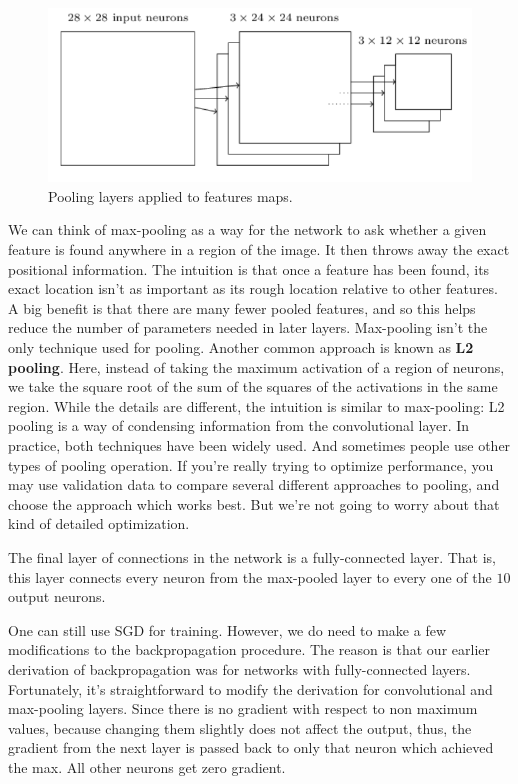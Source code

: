 \documentclass[12pt, letterpaper]{article}
\theoremstyle{definition}
\let\tb\textbf
\begin{document}
\begin{figure}
\centering
\includegraphics[scale=0.5]{img/CNN7}
\caption{Pooling layers applied to features maps.}
\label{fig:CNN7}
\end{figure}
We can think of max-pooling as a way for the network to ask whether a given feature is found anywhere in a region of the image. It then throws away the exact positional information. The intuition is that once a feature has been found, its exact location isn't as important as its rough location relative to other features. A big benefit is that there are many fewer pooled features, and so this helps reduce the number of parameters needed in later layers. Max-pooling isn't the only technique used for pooling. Another common approach is known as \tb{L2 pooling}. Here, instead of taking the maximum activation of a region of neurons, we take the square root of the sum of the squares of the activations in the same region. While the details are different, the intuition is similar to max-pooling: L2 pooling is a way of condensing information from the convolutional layer. In practice, both techniques have been widely used. And sometimes people use other types of pooling operation. If you're really trying to optimize performance, you may use validation data to compare several different approaches to pooling, and choose the approach which works best. But we're not going to worry about that kind of detailed optimization. 

The final layer of connections in the network is a fully-connected layer. That is, this layer connects every neuron from the max-pooled layer to every one of the $10$ output neurons.

One can still use SGD for training. However, we do need to make a few modifications to the backpropagation procedure. The reason is that our earlier derivation of backpropagation was for networks with fully-connected layers. Fortunately, it's straightforward to modify the derivation for convolutional and max-pooling layers. Since there is no gradient with respect to non maximum values, because changing them slightly does not affect the output, thus, the gradient from the next layer is passed back to only that neuron which achieved the max.  All other neurons get zero gradient.
\end{document}
